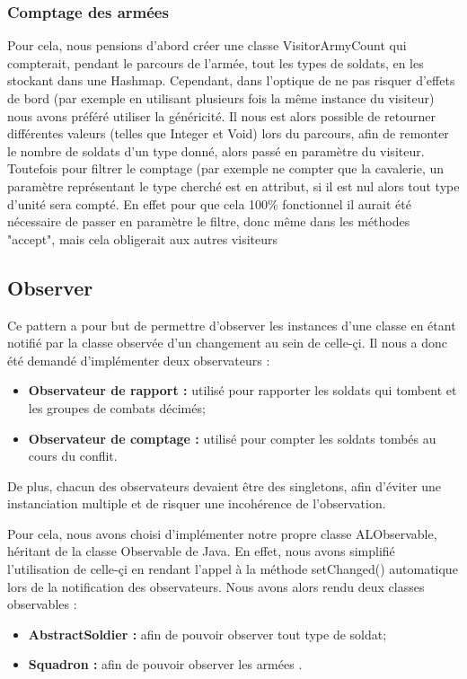 \documentclass[12pt]{article}
\begin{document}
\subsubsection{Comptage des armées}
Pour cela, nous pensions d'abord créer une classe VisitorArmyCount qui compterait, 
pendant le parcours de l'armée, tout les types de soldats, en les stockant dans 
une Hashmap. Cependant, dans l'optique de ne pas risquer d'effets de bord (par 
exemple en utilisant plusieurs fois la même instance du visiteur) nous avons 
préféré utiliser la généricité. Il nous est alors possible de retourner 
différentes valeurs (telles que Integer et Void) lors du parcours, afin de 
remonter le nombre de soldats d'un type donné, alors passé en paramètre du 
visiteur. Toutefois pour filtrer le comptage (par exemple ne compter que la 
cavalerie, un paramètre représentant le type cherché est en attribut, si il est 
nul alors tout type d'unité sera compté. En effet pour que cela 100\% 
fonctionnel il aurait été nécessaire de passer en paramètre le filtre, donc même
dans les méthodes "accept", mais cela obligerait aux autres visiteurs
\subsection{Observer}
Ce pattern a pour but de permettre d'observer les instances d'une classe en étant notifié par la classe observée d'un changement au sein de celle-çi. Il nous a donc été demandé d'implémenter deux observateurs :
\begin{itemize}
\item \textbf{Observateur de rapport :} utilisé pour rapporter les soldats qui tombent et les groupes de combats décimés; 
\item \textbf{Observateur de comptage :} utilisé pour compter les soldats tombés au cours du conflit. 
\end{itemize}
De plus, chacun des observateurs devaient être des singletons, afin d'éviter une instanciation multiple et de risquer une incohérence de l'observation.

Pour cela, nous avons choisi d'implémenter notre propre classe ALObservable, héritant de la classe Observable de Java. En effet, nous avons simplifié l'utilisation de celle-çi en rendant l'appel à la méthode setChanged() automatique lors de la notification des observateurs.
Nous avons alors rendu deux classes observables :
\begin{itemize}
\item \textbf{AbstractSoldier :} afin de pouvoir observer tout type de soldat;
\item \textbf{Squadron :} afin de pouvoir observer les armées .
\end{itemize}
\end{document}
